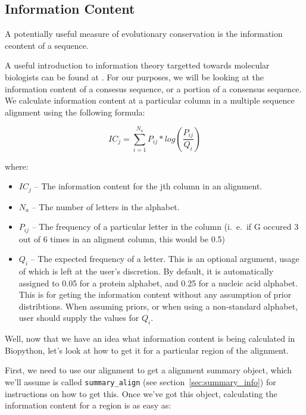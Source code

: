 \documentclass{report}
\begin{document}
\subsection{Information Content}
\label{sec:getting_info_content}

A potentially useful measure of evolutionary conservation is the information ceontent of a sequence.


A useful introduction to information theory targetted towards molecular biologists can be found at . For our purposes, we will be looking at the information content of a consesus sequence, or a portion of a consensus sequence. We calculate information content at a particular column in a multiple sequence alignment using the following formula:

\begin{displaymath}
IC_{j} = \sum_{i=1}^{N_{a}} P_{ij} * log(\frac{P_{ij}}{Q_{i}}) 
\end{displaymath}

where:

\begin{itemize}
  \item $IC_{j}$ -- The information content for the jth column in an alignment.
  \item $N_{a}$ -- The number of letters in the alphabet.
  \item $P_{ij}$ -- The frequency of a particular letter in the column (i.~e.~if G occured 3 out of 6 times in an aligment column, this would be 0.5)
  \item $Q_{i}$ --  The expected frequency of a letter. This is an
  optional argument, usage of which is left at the user's
  discretion. By default, it is automatically assigned to 0.05 for a
  protein alphabet, and 0.25 for a nucleic acid alphabet. This is for
  geting the information content without any assumption of prior
  distribtions. When assuming priors, or when using a non-standard
  alphabet, user should supply the values for $Q_{i}$. 
\end{itemize}

Well, now that we have an idea what information content is being calculated in Biopython, let's look at how to get it for a particular region of the alignment.


First, we need to use our alignment to get a alignment summary object, which we'll assume is called \verb|summary_align| (see section~\ref{sec:summary_info}) for instructions on how to get this. Once we've got this object, calculating the information content for a region is as easy as:
\end{document}
